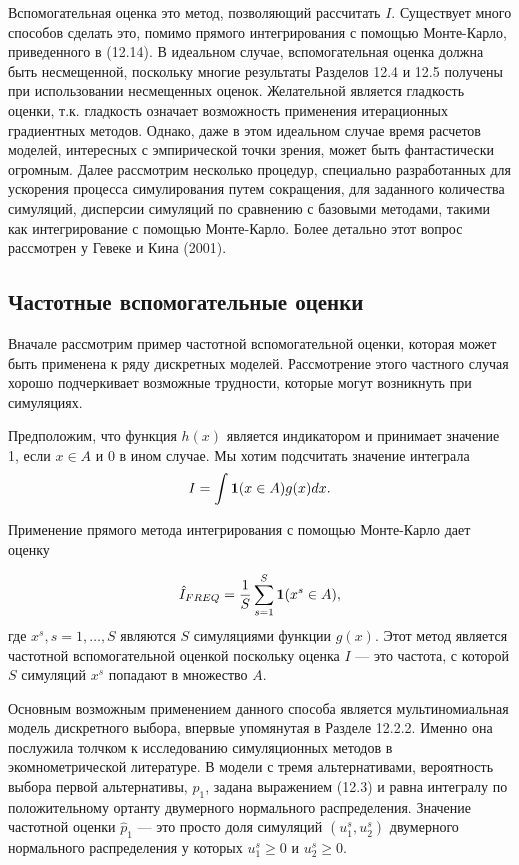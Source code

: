 Вспомогательная оценка это метод, позволяющий рассчитать $I$. Существует много способов сделать это, помимо прямого интегрирования с помощью Монте-Карло, приведенного в (12.14). В идеальном случае, вспомогательная оценка должна быть несмещенной, поскольку многие результаты Разделов 12.4 и 12.5 получены при использовании несмещенных оценок. Желательной является гладкость оценки, т.к. гладкость означает возможность применения итерационных градиентных методов. Однако, даже в этом идеальном случае время расчетов моделей, интересных с эмпирической точки зрения, может быть фантастически огромным. Далее рассмотрим несколько процедур, специально разработанных для ускорения процесса симулирования путем сокращения, для заданного количества симуляций, дисперсии симуляций по сравнению с базовыми методами, такими как интегрирование с помощью Монте-Карло. Более детально этот вопрос рассмотрен у Гевеке и Кина (2001).

\subsection{Частотные вспомогательные оценки}

Вначале рассмотрим пример частотной вспомогательной оценки, которая может быть применена к ряду дискретных моделей. Рассмотрение этого частного случая хорошо подчеркивает возможные трудности, которые могут возникнуть при симуляциях.

Предположим, что функция $h(x)$ является индикатором и принимает значение 1, если $x \in A$ и 0 в ином случае. Мы хотим подсчитать значение интеграла 
\[
I=\int{{\bf{1}}(x \in A)g(x)dx}.
\]

Применение прямого метода интегрирования с помощью Монте-Карло дает оценку

\[
\hat{I}_{FREQ}=\dfrac{1}{S}\sum^{S}_{s=1}{\bf{1}}(x^{s} \in A),
\]
где $x^s,s=1,\ldots ,S$ являются $S$ симуляциями функции $g(x)$. Этот метод является частотной вспомогательной оценкой поскольку оценка $I$ --- это частота, с которой $S$ симуляций $x^s$ попадают в  множество $A$. 

Основным возможным применением данного способа является мультиномиальная модель дискретного выбора, впервые упомянутая в Разделе 12.2.2. Именно она послужила толчком к исследованию симуляционных методов в экомнометрической литературе.  В модели с тремя альтернативами, вероятность выбора первой альтернативы, $p_1$, задана выражением (12.3) и равна интегралу по положительному ортанту двумерного нормального распределения. Значение частотной оценки $\hat{p}_1$ --- это просто доля симуляций $(u^{s}_1,u^{s}_2)$ двумерного нормального распределения у которых $u^{s}_1\geq 0$ и $u^{s}_2\geq 0$.

